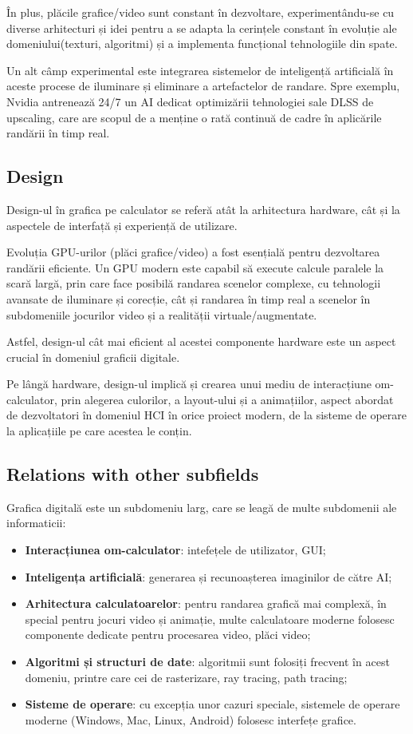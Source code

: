 \documentclass[12pt, letterpaper]{article}
\begin{document}
În plus, plăcile grafice/video sunt constant în dezvoltare, experimentându-se cu diverse arhitecturi și idei pentru a se adapta la cerințele constant în evoluție ale domeniului(texturi, algoritmi) și a implementa funcțional tehnologiile din spate. 

\bigskip
Un alt câmp experimental este integrarea sistemelor de inteligență artificială în aceste procese de iluminare și eliminare a artefactelor de randare. Spre exemplu,  Nvidia antrenează 24/7 un AI dedicat optimizării tehnologiei sale DLSS de upscaling, care are scopul de a menține o rată continuă de cadre în aplicările randării în timp real.


\subsection*{Design}
Design-ul în grafica pe calculator se referă atât la arhitectura hardware, cât și la aspectele de interfață și experiență de utilizare.

\bigskip
Evoluția GPU-urilor (plăci grafice/video) a fost esențială pentru dezvoltarea randării eficiente. Un GPU modern este capabil să execute calcule paralele la scară largă, prin care face posibilă randarea scenelor complexe, cu tehnologii avansate de iluminare și corecție, cât și randarea în timp real a scenelor în subdomeniile jocurilor video și a realității virtuale/augmentate.

Astfel, design-ul cât mai eficient al acestei componente hardware este un aspect crucial în domeniul graficii digitale.

\bigskip
Pe lângă hardware, design-ul implică și crearea unui mediu de interacțiune om-calculator, prin alegerea culorilor, a layout-ului și a animațiilor, aspect abordat de dezvoltatori în domeniul HCI în orice proiect modern, de la sisteme de operare la aplicațiile pe care acestea le conțin.


\subsection*{Relations with other subfields}
Grafica digitală este un subdomeniu larg, care se leagă de multe subdomenii ale informaticii: 
\begin{itemize}
    \item \textbf{Interacțiunea om-calculator}:  intefețele de utilizator, GUI;
    \item \textbf{Inteligența artificială}: generarea și recunoașterea imaginilor de către AI;
    \item \textbf{Arhitectura calculatoarelor}: pentru randarea grafică mai complexă, în special pentru jocuri video și animație, multe calculatoare moderne folosesc componente dedicate pentru procesarea video, plăci video;
    \item \textbf{Algoritmi și structuri de date}: algoritmii sunt folosiți frecvent în acest domeniu, printre care cei de rasterizare, ray tracing, path tracing;
    \item \textbf{Sisteme de operare}: cu excepția unor cazuri speciale, sistemele de operare moderne (Windows, Mac, Linux, Android) folosesc interfețe grafice.
\end{itemize}
\end{document}
